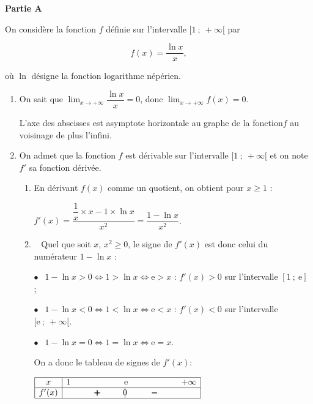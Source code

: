 \bigskip

\textbf{Partie A}

\medskip

On considère la fonction $f$ définie sur l'intervalle $[1~;~+\infty[$ par 

\[f(x) = \dfrac{\ln x}{x},\]

où $\ln$ désigne la fonction logarithme népérien.

\medskip

\begin{enumerate}
\item 
On sait que $\displaystyle\lim_{x \to + \infty} \dfrac{\ln x}{x} = 0$, donc $\displaystyle\lim_{x \to + \infty} f(x) = 0$.

L'axe des abscisses est asymptote horizontale au graphe de la fonction$f$ au voisinage de plus l'infini.
\item On admet que la fonction $f$ est dérivable sur l'intervalle $[1~;~+\infty[$ et on note $f'$ sa fonction dérivée.
	\begin{enumerate}
		\item 
En dérivant $f(x)$ comme un quotient, on obtient pour $x \geqslant 1$ :
		
$f'(x) = \dfrac{\dfrac{1}{x} \times x - 1 \times \ln x}{x^2} = \dfrac{1 - \ln x}{x^2}$.

		\item~ 
Quel que soit $x$,\: $x^2 \geqslant 0$, le signe de $f'(x)$ est donc celui du numérateur $1 - \ln x$ :

$\bullet~~$ $1 - \ln x > 0 \iff 1 > \ln x \iff \text{e} > x$ : $f'(x) > 0$ sur l'intervalle $[1~;~\text{e}]$ ;

$\bullet~~$ $1 - \ln x < 0 \iff 1 < \ln x \iff \text{e} < x$ : $f'(x) < 0$ sur l'intervalle $[\text{e}~;~+ \infty[$.

$\bullet~~$ $1 - \ln x = 0 \iff 1 = \ln x \iff \text{e} = x$.

On a donc le tableau de signes de $f'(x)$:

\begin{center}
\renewcommand{\arraystretch}{1.2}
\def\esp{\hspace*{1.5cm}}
$\begin{array}{|c | *{5}{c} |} 
\hline
x  & 1 & \esp & \text e & \esp  & +\infty \\
\hline
f'(x) &  & \pmb{+} &  \vline\hspace{-2.7pt}{0} & \pmb{-} &    \\
\hline
\end{array}$
\renewcommand{\arraystretch}{1}
\end{center}


\end{enumerate}
\end{enumerate}
